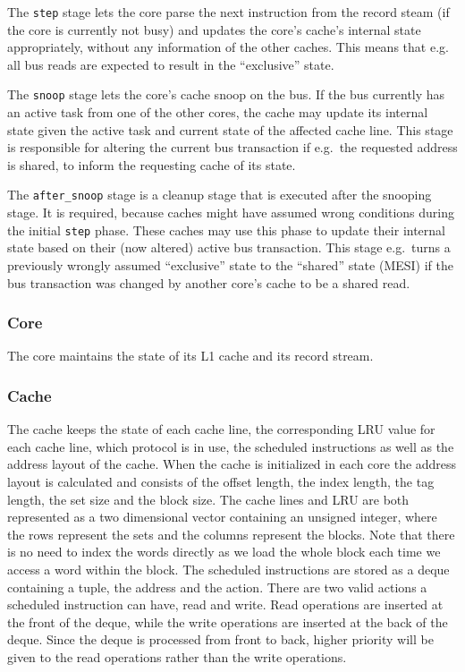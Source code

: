 The \texttt{step} stage lets the core parse the next instruction from the record steam (if the core
is currently not busy) and updates the core's cache's internal state appropriately, without any
information of the other caches. This means that e.g. all bus reads are expected to result in the
``exclusive'' state.

The \texttt{snoop} stage lets the core's cache snoop on the bus.
If the bus currently has an active task from one of the other cores, the cache may update its
internal state given the active task and current state of the affected cache line. This stage is
responsible for altering the current bus transaction if e.g.\ the requested address is shared, to
inform the requesting cache of its state.

The \texttt{after\_snoop} stage is a cleanup stage that is executed after the snooping stage.
It is required, because caches might have assumed wrong conditions during the initial \texttt{step}
phase. These caches may use this phase to update their internal state based on their (now altered)
active bus transaction. This stage e.g.\ turns a previously wrongly assumed ``exclusive'' state to
the ``shared'' state (MESI) if the bus transaction was changed by another core's cache to be a
shared read.

\subsubsection{Core}
The core maintains the state of its L1 cache and its record stream.

\subsubsection{Cache}
The cache keeps the state of each cache line, the corresponding LRU value for each cache line, which
protocol is in use, the scheduled instructions as well as the address layout of the cache.  When the
cache is initialized in each core the address layout is calculated and consists of the offset
length, the index length, the tag length, the set size and the block size.  The cache lines and LRU
are both represented as a two dimensional vector containing an unsigned integer, where the rows
represent the sets and the columns represent the blocks.  Note that there is no need to index the
words directly as we load the whole block each time we access a word within the block.  The
scheduled instructions are stored as a deque containing a tuple, the address and the action.  There
are two valid actions a scheduled instruction can have, read and write.  Read operations are
inserted at the front of the deque, while the write operations are inserted at the back of the
deque.  Since the deque is processed from front to back, higher priority will be given to the read
operations rather than the write operations.

